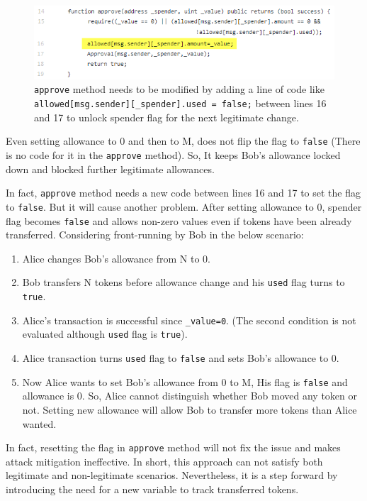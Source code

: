 \begin{figure}[t]
	\centering
	\includegraphics[width=1.0\linewidth]{figures/multiple_withdrawal_33.png}
	\caption{\texttt{approve} method needs to be modified by adding a line of code like \texttt{allowed[msg.sender][\_spender].used = false;} between lines 16 and 17 to unlock spender flag for the next legitimate change.\label{fig:det}}
\end{figure}

\noindent Even setting allowance to 0 and then to M, does not flip the flag to \texttt{false} (There is no code for it in the \texttt{approve} method). So, It keeps Bob’s allowance locked down and blocked further legitimate allowances.

In fact, \texttt{approve} method needs a new code between lines 16 and 17 to set the flag to \texttt{false}. But it will cause another problem. After setting allowance to 0, spender flag becomes \texttt{false} and allows non-zero values even if tokens have been already transferred. Considering front-running by Bob in the below scenario:
\begin{enumerate}
	\item Alice changes Bob's allowance from N to 0.
	\item Bob transfers N tokens before allowance change and his \texttt{used} flag turns to \texttt{true}.
	\item Alice's transaction is successful since \texttt{\_value=0}. (The second condition is not evaluated although \texttt{used} flag is \texttt{true}).
	\item Alice transaction turns \texttt{used} flag to \texttt{false} and sets Bob's allowance to 0. 
	\item Now Alice wants to set Bob's allowance from 0 to M, His flag is \texttt{false} and allowance is 0. So, Alice cannot distinguish whether Bob moved any token or not. Setting new allowance will allow Bob to transfer more tokens than Alice wanted.
\end{enumerate}
In fact, resetting the flag in \texttt{approve} method will not fix the issue and makes attack mitigation ineffective. In short, this approach can not satisfy both legitimate and non-legitimate scenarios. Nevertheless, it is a step forward by introducing the need for a new variable to track transferred tokens.\newline

